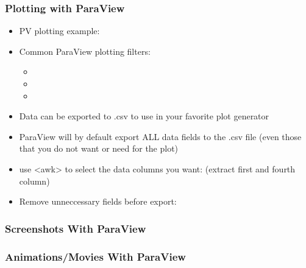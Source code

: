 \begin{frame}

  \frametitle{Plotting with ParaView}

  \begin{itemize}

      \item PV plotting example: 

      \item Common ParaView plotting filters:
      \begin{itemize}

        \item {} 

        \item {} 

        \item {} 

      \end{itemize}

    \item Data can be exported to .csv to use in your favorite plot generator 

    \item ParaView will by default export ALL data fields to the .csv file (even those that you do not want or need for the plot) 

    \item {} use <awk> to select the data columns you want:  (extract first and fourth column)

    \item {} Remove unneccessary fields before export: 

  \end{itemize}

\end{frame}

\begin{frame}
  \frametitle{Screenshots With ParaView}
\end{frame}

\begin{frame}
  \frametitle{Animations/Movies With ParaView}
\end{frame}

